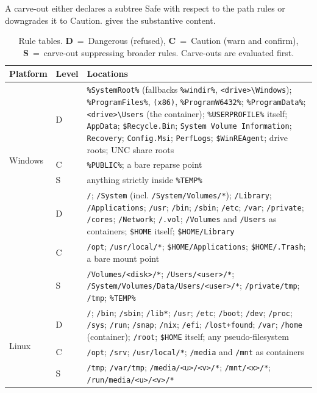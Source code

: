\documentclass[11pt,a4paper]{article}
\newcommand{\code}[1]{\texttt{\small #1}}
\begin{document}
A carve-out either declares a subtree \textsf{Safe} with respect to the path rules or
downgrades it to \textsf{Caution}.  gives the substantive content.

\begin{table}[t]
\centering
\small
\caption{Rule tables. \textbf{D}~=~\textsf{Dangerous} (refused), \textbf{C}~=~\textsf{Caution}
(warn and confirm), \textbf{S}~=~carve-out suppressing broader rules. Carve-outs are
evaluated first.}
\label{tab:rules}
\begin{tabularx}{\textwidth}{@{}l l X@{}}
\toprule
\textbf{Platform} & \textbf{Level} & \textbf{Locations} \\
\midrule
\multirow{4}{*}{Windows}
 & D & \code{\%SystemRoot\%} (fallbacks \code{\%windir\%},
       \code{<drive>\textbackslash Windows}); \code{\%ProgramFiles\%},
       \code{(x86)}, \code{\%ProgramW6432\%}; \code{\%ProgramData\%};
       \code{<drive>\textbackslash Users} (the container); \code{\%USERPROFILE\%} itself;
       \code{AppData}; \code{\$Recycle.Bin}; \code{System Volume Information};
       \code{Recovery}; \code{Config.Msi}; \code{PerfLogs}; \code{\$WinREAgent};
       drive roots; UNC share roots \\
 & C & \code{\%PUBLIC\%}; a bare reparse point \\
 & S & anything strictly inside \code{\%TEMP\%} \\
\midrule
\multirow{3}{*}{macOS}
 & D & \code{/}; \code{/System} (incl. \code{/System/Volumes/*}); \code{/Library};
       \code{/Applications}; \code{/usr}; \code{/bin}; \code{/sbin}; \code{/etc};
       \code{/var}; \code{/private}; \code{/cores}; \code{/Network}; \code{/.vol};
       \code{/Volumes} and \code{/Users} as containers; \code{\$HOME} itself;
       \code{\$HOME/Library} \\
 & C & \code{/opt}; \code{/usr/local/*}; \code{\$HOME/Applications};
       \code{\$HOME/.Trash}; a bare mount point \\
 & S & \code{/Volumes/<disk>/*}; \code{/Users/<user>/*};
       \code{/System/Volumes/Data/Users/<user>/*}; \code{/private/tmp}; \code{/tmp};
       \code{\%TEMP\%} \\
\midrule
\multirow{3}{*}{Linux}
 & D & \code{/}; \code{/bin}; \code{/sbin}; \code{/lib*}; \code{/usr}; \code{/etc};
       \code{/boot}; \code{/dev}; \code{/proc}; \code{/sys}; \code{/run};
       \code{/snap}; \code{/nix}; \code{/efi}; \code{/lost+found}; \code{/var};
       \code{/home} (container); \code{/root}; \code{\$HOME} itself; any
       pseudo-filesystem \\
 & C & \code{/opt}; \code{/srv}; \code{/usr/local/*}; \code{/media} and \code{/mnt}
       as containers \\
 & S & \code{/tmp}; \code{/var/tmp}; \code{/media/<u>/<v>/*}; \code{/mnt/<x>/*};
       \code{/run/media/<u>/<v>/*} \\
\bottomrule
\end{tabularx}
\end{table}
\end{document}
